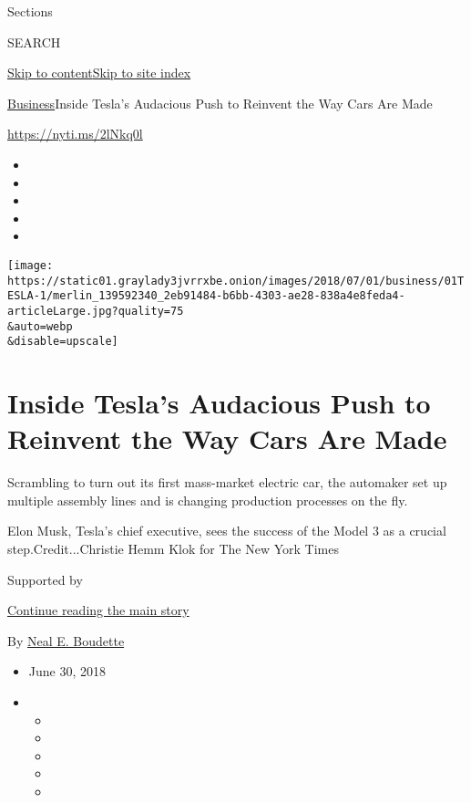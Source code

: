 Sections

SEARCH

\protect\hyperlink{site-content}{Skip to
content}\protect\hyperlink{site-index}{Skip to site index}

\href{/section/business}{Business}\textbar{}Inside Tesla's Audacious
Push to Reinvent the Way Cars Are Made

\url{https://nyti.ms/2lNkq0l}

\begin{itemize}
\item
\item
\item
\item
\item
\end{itemize}

\texttt{[image: https://static01.graylady3jvrrxbe.onion/images/2018/07/01/business/01TESLA-1/merlin\_139592340\_2eb91484-b6bb-4303-ae28-838a4e8feda4-articleLarge.jpg?quality=75\\\&auto=webp\\\&disable=upscale]}

\hypertarget{inside-teslas-audacious-push-to-reinvent-the-way-cars-are-made}{%
\section{Inside Tesla's Audacious Push to Reinvent the Way Cars Are
Made}\label{inside-teslas-audacious-push-to-reinvent-the-way-cars-are-made}}

Scrambling to turn out its first mass-market electric car, the automaker
set up multiple assembly lines and is changing production processes on
the fly.

Elon Musk, Tesla's chief executive, sees the success of the Model 3 as a
crucial step.Credit...Christie Hemm Klok for The New York Times

Supported by

\protect\hyperlink{after-sponsor}{Continue reading the main story}

By \href{https://www.nytimes3xbfgragh.onion/by/neal-e-boudette}{Neal E.
Boudette}

\begin{itemize}
\item
  June 30, 2018
\item
  \begin{itemize}
  \item
  \item
  \item
  \item
  \item
  \end{itemize}
\end{itemize}

